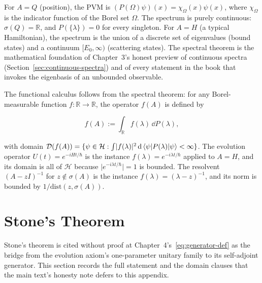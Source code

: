 For $A = Q$ (position), the PVM is $(P(\Omega)\psi)(x) = \chi_\Omega(x)\psi(x)$, where $\chi_\Omega$ is the indicator function of the Borel set $\Omega$. The spectrum is purely continuous: $\sigma(Q) = \mathbb{R}$, and $P(\{\lambda\}) = 0$ for every singleton. For $A = H$ (a typical Hamiltonian), the spectrum is the union of a discrete set of eigenvalues (bound states) and a continuum $[E_0, \infty)$ (scattering states). The spectral theorem is the mathematical foundation of Chapter~3's honest preview of continuous spectra (Section~\ref{sec:continuous-spectra}) and of every statement in the book that invokes the eigenbasis of an unbounded observable.

The functional calculus follows from the spectral theorem: for any Borel-measurable function $f : \mathbb{R} \to \mathbb{R}$, the operator $f(A)$ is defined by
\begin{linenomath}
    \begin{equation}
        f(A) := \int_{\mathbb{R}} f(\lambda)\,\dd P(\lambda),
        \label{eq:functional-calculus}
    \end{equation}
\end{linenomath}
with domain $\mathcal{D}(f(A)) = \{\psi \in \mathcal{H} : \int \lvert f(\lambda)\rvert^2\,\mathrm{d}\braket{\psi|P(\lambda)|\psi} < \infty\}$. The evolution operator $U(t) = e^{-iHt/\hbar}$ is the instance $f(\lambda) = e^{-i\lambda t/\hbar}$ applied to $A = H$, and its domain is all of $\mathcal{H}$ because $\lvert e^{-i\lambda t/\hbar}\rvert = 1$ is bounded. The resolvent $(A - zI)^{-1}$ for $z \notin \sigma(A)$ is the instance $f(\lambda) = (\lambda - z)^{-1}$, and its norm is bounded by $1/\mathrm{dist}(z, \sigma(A))$.

\section{Stone's Theorem}
\label{sec:appendix-stone}

Stone's theorem is cited without proof at Chapter~4's~\eqref{eq:generator-def} as the bridge from the evolution axiom's one-parameter unitary family to its self-adjoint generator. This section records the full statement and the domain clauses that the main text's honesty note defers to this appendix.

